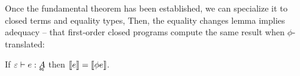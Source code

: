 Once the fundamental theorem has been established, we can specialize it to
closed terms and equality types, Then, the equality changes lemma implies
adequacy -- that first-order closed programs compute the same result when
$\phi$-translated:

\begin{theorem}[adequacy]
  If $\J e {\emptycx} {\eqt A}$ then $\llbracket{e}\rrbracket = \llbracket{\phi e}\rrbracket$.
\end{theorem}






